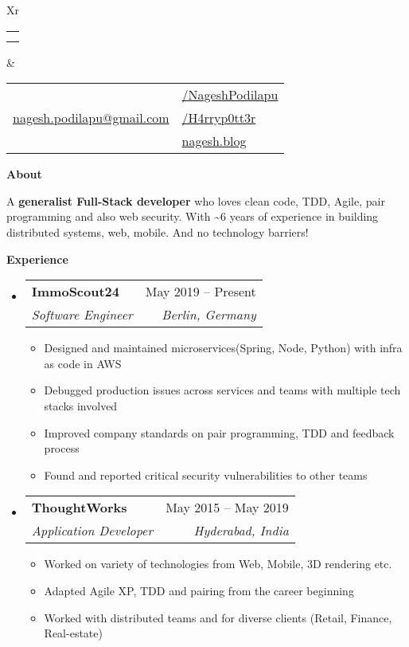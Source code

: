 \documentclass[letterpaper,12pt]{article}[leftmargin=*]
\makeatletter
\def \fullname {Nagesh Podilapu}
\def \subtitle {}
\def \linkedinicon {\faLinkedin}
\def \linkedinlink {https://www.linkedin.com/in/h4rryp0tt3r/}
\def \linkedintext {/NageshPodilapu}
\def \phoneicon {\faPhone}
\def \phonetext {+49 17627791530}
\def \emailicon {\faEnvelope}
\def \emaillink {mailto:nagesh.podilapu@gmail.com}
\def \emailtext {nagesh.podilapu@gmail.com}
\def \githubicon {\faGithub}
\def \githublink {https://github.com/H4rryp0tt3r}
\def \githubtext {/H4rryp0tt3r}
\def \websiteicon {\faGlobe}
\def \websitelink {https://nagesh.blog}
\def \websitetext {nagesh.blog}
\def \headertype {\doublecol} %
\def \entryspacing {-0pt}
\def \linkedin {\linkedinicon \hspace{3pt}\href{\linkedinlink}{\linkedintext}}
\def \phone {\phoneicon \hspace{3pt}{ \phonetext}}
\def \email {\emailicon \hspace{3pt}\href{\emaillink}{\emailtext}}
\def \github {\githubicon \hspace{3pt}\href{\githublink}{\githubtext}}
\def \website {\websiteicon \hspace{3pt}\href{\websitelink}{\websitetext}}
\renewcommand{\section}[2]{\vspace{5pt}
  \colorbox{secondary}{\color{white}\raggedbottom\normalsize\textbf{{#1}{\hspace{7pt}#2}}}
}
\newcommand{\resumeEntryStart}{\begin{itemize}[leftmargin=2.5mm]}
\newcommand{\resumeEntryEnd}{\end{itemize}\vspace{\entryspacing}}
\newcommand{\resumeEntryBioStart}{\vspace{8pt}\begin{adjustwidth}{2.5mm}{2.5mm}\small}
\newcommand{\resumeEntryBioEnd}{\end{adjustwidth}\vspace{6pt}}
\newcommand{\resumeItemListStart}{\begin{itemize}[leftmargin=4.5mm]}
\newcommand{\resumeItemListEnd}{\end{itemize}}
\newcommand{\resumeItem}[1]{
  \item\small{
    {#1 \vspace{-2pt}}
  }
}
\newcommand{\resumeEntryTSDL}[4]{
  \vspace{-1pt}\item[]
    \begin{tabularx}{0.97\textwidth}{X@{\hspace{60pt}}r}
      \textbf{\color{primary}#1} & {\firabook\color{accent}\small#2} \\
      \textit{\color{accent}\small#3} & \textit{\color{accent}\small#4} \\
    \end{tabularx}\vspace{-6pt}
}
\newcommand{\doublecol}[6]{
  \begin{tabularx}{\textwidth}{Xr}
    {
      \begin{tabular}[c]{l}
        \fontsize{35}{45}\selectfont{\color{primary}{{\textbf{\fullname}}}} \\
        {\textit{\subtitle}} %
      \end{tabular}
    } & {
      \begin{tabular}[c]{l@{\hspace{1.5em}}l}
        {\small#4} & {\small#1} \\
        {\small#5} & {\small#2} \\
        {\small#6} & {\small#3}
      \end{tabular}
    }
  \end{tabularx}
}
\newcommand{\singlecol}[6]{
  \begin{tabularx}{\textwidth}{Xr}
    {
      \begin{tabular}[b]{l}
        \fontsize{35}{45}\selectfont{\color{primary}{{\textbf{\fullname}}}} \\
        {\textit{\subtitle}} %
      \end{tabular}
    } & {
      \begin{tabular}[c]{l}
        {\small#1} \\
        {\small#2} \\
        {\small#3} \\
        {\small#4} \\
        {\small#5} \\
        {\small#6}
      \end{tabular}
    }
  \end{tabularx}
}
\makeatother
\begin{document}


\headertype{\linkedin}{\github}{\website}{\phone}{\email}{} %

\section{\faUser}{About}
  \resumeEntryBioStart
  {A \textbf{generalist Full-Stack developer} who loves clean code, TDD, Agile, pair programming and also web security. With \textasciitilde6 years of experience in building distributed systems, web, mobile. And no technology barriers!}
  \resumeEntryBioEnd
\section{\faPieChart}{Experience}

  \resumeEntryStart
    \resumeEntryTSDL
      {ImmoScout24}{May 2019 -- Present}
      {Software Engineer}{Berlin, Germany}
    \resumeItemListStart
      \resumeItem {Designed and maintained microservices(Spring, Node, Python) with infra as code in AWS}
      \resumeItem {Debugged production issues across services and teams with multiple tech stacks involved}
      \resumeItem {Improved company standards on pair programming, TDD and feedback process}
      \resumeItem {Found and reported critical security vulnerabilities to other teams}
    \resumeItemListEnd
  \resumeEntryEnd

  \resumeEntryStart
    \resumeEntryTSDL
      {Thought{\normalfont Works\textsuperscript{\textregistered}}}{May 2015 -- May 2019}
      {Application Developer}{Hyderabad, India}
    \resumeItemListStart
      \resumeItem {Worked on variety of technologies from Web, Mobile, 3D rendering etc.}
      \resumeItem {Adapted Agile XP, TDD and pairing from the career beginning}
      \resumeItem {Worked with distributed teams and for diverse clients (Retail, Finance, Real-estate)}
    \resumeItemListEnd
  \resumeEntryEnd

\end{document}
